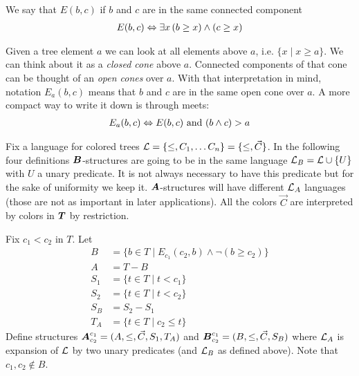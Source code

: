 \documentclass{amsart}
\DeclareMathOperator{\TT}{\boldface T}
\DeclareMathOperator{\A}{\boldface A}
\DeclareMathOperator{\B}{\boldface B}
\begin{document}
\begin{Definition}
	We say that $E(b, c)$ if $b$ and $c$ are in the same connected component
	\begin{align*}
		E(b, c) \Leftrightarrow \exists x \, (b \geq x) \wedge (c \geq x)
	\end{align*}
\end{Definition}
\begin{Definition}
	Given a tree element $a$ we can look at all elements above $a$, i.e. $\{x \mid x \geq a\}$. We can think about it as a \emph{closed cone} above $a$. Connected components of that cone can be thought of an \emph{open cones} over $a$. With that interpretation in mind, notation $E_a(b, c)$ means that $b$ and $c$ are in the same open cone over $a$. A more compact way to write it down is through meets:
	\begin{align*}
		E_a(b, c) \Leftrightarrow E(b,c) \text{ and } (b \wedge c) > a
	\end{align*}
\end{Definition}

Fix a language for colored trees $\mathcal L = \{\leq, C_1, \ldots C_n\} = \{\leq, \vec C\}$. In the following four definitions $\B$-structures are going to be in the same language $\mathcal L_B = \mathcal L \cup \{U\}$ with $U$ a unary predicate. It is not always necessary to have this predicate but for the sake of uniformity we keep it. $\A$-structures will have different $\mathcal L_A$ languages (those are not as important in later applications). All the colors $\vec C$ are interpreted by colors in $\TT$ by restriction.


\begin{Definition}
	Fix $c_1 < c_2$ in $T$. Let
	\begin{align*}
		B &= \{b \in T \mid E_{c_1}(c_2, b) \wedge \neg(b \geq c_2)\} \\
		A &= T - B \\
		S_1 &= \{t \in T \mid t < c_1\} \\
		S_2 &= \{t \in T \mid t < c_2\} \\
		S_B &= S_2 - S_1 \\
		T_A &= \{t \in T \mid c_2 \leq t\}
	\end{align*}
	Define structures $\A^{c_1}_{c_2} = (A, \leq, \vec C, S_1, T_A)$ and $\B^{c_1}_{c_2} = (B, \leq, \vec C, S_B)$ where $\mathcal L_A$ is expansion of $\mathcal L$ by two unary predicates (and $\mathcal L_B$ as defined above). Note that $c_1, c_2 \notin B$.
\end{Definition}
\end{document}
